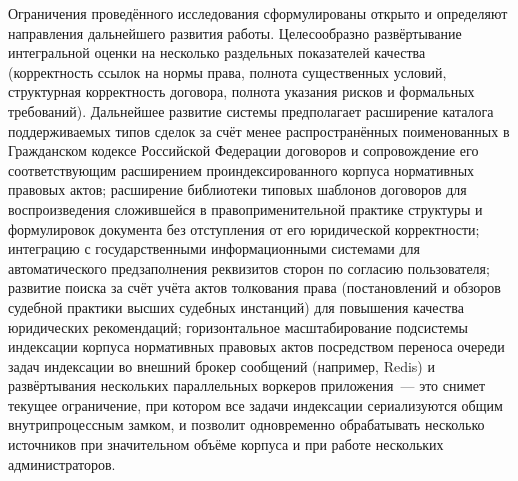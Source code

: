 Ограничения проведённого исследования сформулированы открыто и определяют направления дальнейшего развития работы. Целесообразно развёртывание интегральной оценки на несколько раздельных показателей качества (корректность ссылок на нормы права, полнота существенных условий, структурная корректность договора, полнота указания рисков и формальных требований). Дальнейшее развитие системы предполагает расширение каталога поддерживаемых типов сделок за счёт менее распространённых поименованных в Гражданском кодексе Российской Федерации договоров и сопровождение его соответствующим расширением проиндексированного корпуса нормативных правовых актов; расширение библиотеки типовых шаблонов договоров для воспроизведения сложившейся в правоприменительной практике структуры и формулировок документа без отступления от его юридической корректности; интеграцию с государственными информационными системами для автоматического предзаполнения реквизитов сторон по согласию пользователя; развитие поиска за счёт учёта актов толкования права (постановлений и обзоров судебной практики высших судебных инстанций) для повышения качества юридических рекомендаций; горизонтальное масштабирование подсистемы индексации корпуса нормативных правовых актов посредством переноса очереди задач индексации во внешний брокер сообщений (например, Redis) и развёртывания нескольких параллельных воркеров приложения~--- это снимет текущее ограничение, при котором все задачи индексации сериализуются общим внутрипроцессным замком, и позволит одновременно обрабатывать несколько источников при значительном объёме корпуса и при работе нескольких администраторов.
